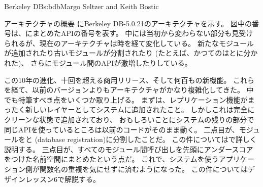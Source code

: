\begin{aosachapter}{Berkeley DB}{s:bdb}{Margo Seltzer and Keith Bostic}
\begin{aosasect1}{アーキテクチャの概要}
にBerkeley DB-5.0.21のアーキテクチャを示す。
図中の番号は、にまとめたAPIの番号を表す。
中には当初から変わらない部分も見受けられるが、現在のアーキテクチャは時を経て変化している。
新たなモジュールが追加されたり古いモジュールが分割されたり
(たとえば、かつてのはとに分かれた)、
さらにモジュール間のAPIが激増したりしている。

この10年の進化、十回を超える商用リリース、そして何百もの新機能。
これらを経て、以前のバージョンよりもアーキテクチャがかなり複雑化してきた。
中でも特筆すべき点をいくつか取り上げる。
まずは、レプリケーション機能がまったく新しいレイヤーとしてシステムに追加されたこと。
しかしこれは完全にクリーンな状態で追加されており、
おもしろいことにシステムの残りの部分で同じAPIを使っているところは以前のコードがそのまま動く。
二点目が、モジュールをと (database registration)に分割したことだ。
この件についてはで詳しく説明する。
三点目が、すべてのモジュール間呼び出しを先頭にアンダースコアをつけた名前空間にまとめたという点だ。
これで、システムを使うアプリケーション側が関数名の重複を気にせずに済むようになった。
この件についてはデザインレッスン6で解説する。


\end{aosasect1}
\end{aosachapter}

